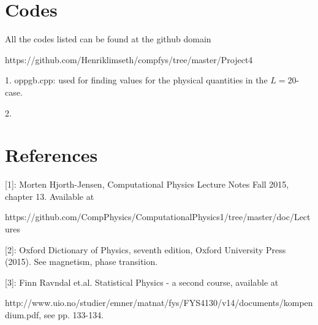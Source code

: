 \documentclass[english, 12pt]{article}
\begin{document}
\section{Codes}
All the codes listed can be found at the github domain

https://github.com/Henriklimseth/compfys/tree/master/Project4

1. oppgb.cpp: used for finding values for the physical quantities in the $L=20$-case.

2. 

\section{References}
[1]: Morten Hjorth-Jensen, Computational Physics Lecture Notes Fall 2015, chapter 13. Available at

https://github.com/CompPhysics/ComputationalPhysics1/tree/master/doc/Lectures

[2]: Oxford Dictionary of Physics, seventh edition, Oxford University Press (2015). See magnetism, phase transition. 

[3]: Finn Ravndal et.al. Statistical Physics - a second course, available at

http://www.uio.no/studier/emner/matnat/fys/FYS4130/v14/documents/kompendium.pdf, see pp. 133-134.
\end{document}
